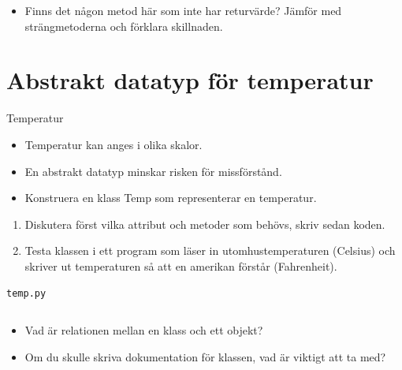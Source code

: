 \begin{frame}
  \begin{question}
    \begin{itemize}
      \item Finns det någon metod här som inte har returvärde? Jämför med 
        strängmetoderna och förklara skillnaden.
    \end{itemize}
  \end{question}
\end{frame}


\section[Abstrakt datatyp]{Abstrakt datatyp för temperatur}

\begin{frame}
  \begin{block}{Temperatur}
    \begin{itemize}
      \item Temperatur kan anges i olika skalor.
      \item En abstrakt datatyp minskar risken för missförstånd.
    \end{itemize}
  \end{block}
  \begin{exercise}
    \begin{itemize}
      \item Konstruera en klass Temp som representerar en temperatur.
    \end{itemize}
    \begin{enumerate}
      \item Diskutera först vilka attribut och metoder som behövs, skriv sedan 
        koden.
        \pause
      \item Testa klassen i ett program som läser in utomhustemperaturen 
        (Celsius) och skriver ut temperaturen så att en amerikan förstår 
        (Fahrenheit).
    \end{enumerate}
  \end{exercise}
\end{frame}

\begin{frame}[fragile]
  \texttt{temp.py}\hrulefill
  \inputminted{python}{src/temp.py}
\end{frame}

\begin{frame}
  \begin{question}
    \begin{itemize}
      \item Vad är relationen mellan en klass och ett objekt?
      \item Om du skulle skriva dokumentation för klassen, vad är viktigt att 
        ta med?
    \end{itemize}
  \end{question}
\end{frame}


